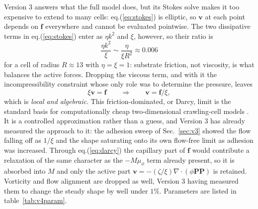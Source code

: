 \documentclass[11pt]{article}
\begin{document}
Version 3 answers what the full model does, but its Stokes solve makes it too
expensive to extend to many cells: eq.(\ref{eq:stokes}) is elliptic, so
$\mathbf{v}$ at each point depends on $\mathbf{f}$ everywhere and cannot be
evaluated pointwise. The two dissipative terms in eq.(\ref{eq:stokes}) enter as
$\eta k^{2}$ and $\xi$, however, so their ratio is
\begin{equation}\label{eq:ratio}
\frac{\eta k^{2}}{\xi}\sim\frac{\eta}{\xi R^{2}}\approx 0.006
\end{equation}
for a cell of radius $R\approx13$ with $\eta=\xi=1$: substrate friction, not
viscosity, is what balances the active forces. Dropping the viscous term, and
with it the incompressibility constraint whose only role was to determine the
pressure, leaves
\begin{equation}\label{eq:darcy}
\xi\mathbf{v}=\mathbf{f}
\qquad\Longrightarrow\qquad
\mathbf{v}=\mathbf{f}/\xi,
\end{equation}
which is \textit{local and algebraic}. This friction-dominated, or Darcy, limit is
the standard basis for computationally cheap two-dimensional crawling-cell models
\cite{Ziebert:2013}. It is a controlled approximation rather than a guess, and
Version 3 has already measured the approach to it: the adhesion sweep of
Sec.~\ref{sec:v3} showed the flow falling off as $1/\xi$ and the shape saturating
onto its own flow-free limit as adhesion was increased. Through
eq.(\ref{eq:darcy}) the capillary part of $\mathbf{f}$ would contribute a
relaxation of the same character as the $-M\mu_\phi$ term already present, so it
is absorbed into $M$ and only the active part
$\mathbf{v}=-(\zeta/\xi)\nabla\cdot(\phi\mathbf{P}\mathbf{P})$ is retained.
Vorticity and flow alignment are dropped as well, Version 3 having measured them
to change the steady shape by well under $1\%$. Parameters are listed in
table~\ref{tab:v4param}.
\end{document}
